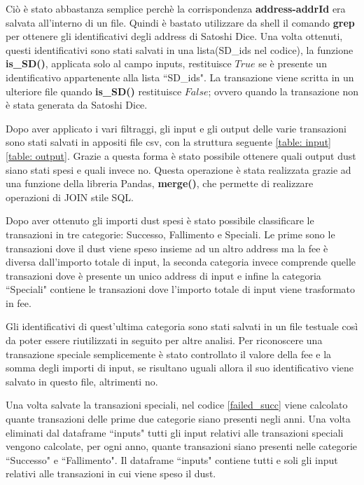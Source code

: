 Ciò è stato abbastanza semplice perchè la corrispondenza \textbf{address-addrId} era salvata all'interno di un file. Quindi è bastato utilizzare da shell il comando \textbf{grep} per ottenere gli identificativi degli address di Satoshi Dice. Una volta ottenuti, questi identificativi sono stati salvati in una lista(SD\_ids nel codice), la funzione \textbf{is\_SD()}, applicata solo al campo inputs, restituisce $True$ se è presente un identificativo appartenente alla lista ``SD\_ids". La transazione viene scritta in un ulteriore file quando \textbf{is\_SD()} restituisce $False$; ovvero quando la transazione non è stata generata da Satoshi Dice.

Dopo aver applicato i vari filtraggi, gli input e gli output delle varie transazioni sono stati salvati in appositi file csv, con la struttura seguente \ref{table: input} \ref{table: output}. Grazie a questa forma è stato possibile ottenere quali output dust siano stati spesi e quali invece no. Questa operazione è stata realizzata grazie ad una funzione della libreria Pandas, \textbf{merge()}, che permette di realizzare operazioni di JOIN stile SQL.

Dopo aver ottenuto gli importi dust spesi è stato possibile classificare le transazioni in tre categorie: Successo, Fallimento e Speciali. Le prime sono le transazioni dove il dust viene speso insieme ad un altro address ma la fee è diversa dall'importo totale di input, la seconda categoria invece comprende quelle transazioni dove è presente un unico address di input e infine la categoria ``Speciali" contiene le transazioni dove l'importo totale di input viene trasformato in fee. 

Gli identificativi di quest'ultima categoria sono stati salvati in un file testuale così da poter essere riutilizzati in seguito per altre analisi. Per riconoscere una transazione speciale semplicemente è stato controllato il valore della fee e la somma degli importi di input, se risultano uguali allora il suo identificativo viene salvato in questo file, altrimenti no.

Una volta salvate la transazioni speciali, nel codice \ref{failed_succ} viene calcolato quante transazioni delle prime due categorie siano presenti negli anni. Una volta eliminati dal dataframe ``inputs" tutti gli input relativi alle transazioni speciali vengono calcolate, per ogni anno, quante transazioni siano presenti nelle categorie ``Successo" e ``Fallimento". Il dataframe ``inputs" contiene tutti e soli gli input relativi alle transazioni in cui viene speso il dust. 

